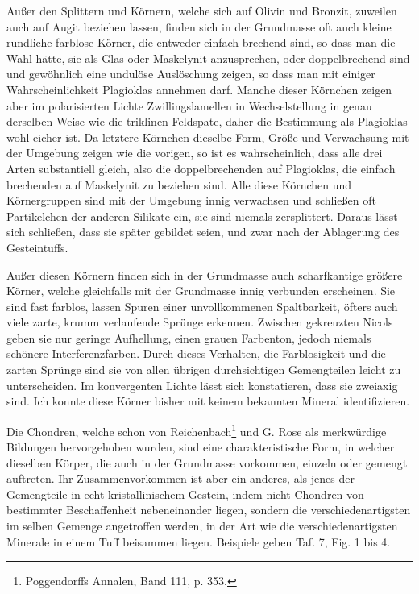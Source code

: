 \documentclass[a4paper, 12pt, oneside]{article}
\begin{document}
Außer den Splittern und Körnern, welche sich auf Olivin und Bronzit, zuweilen auch auf Augit beziehen lassen, finden sich in der Grundmasse oft auch kleine rundliche farblose Körner, die entweder einfach brechend sind, so dass man die Wahl hätte, sie als Glas oder Maskelynit anzusprechen, oder doppelbrechend sind und gewöhnlich eine undulöse Auslöschung zeigen, so dass man mit einiger Wahrscheinlichkeit Plagioklas annehmen darf. Manche dieser Körnchen zeigen aber im polarisierten Lichte Zwillingslamellen in Wechselstellung in genau derselben Weise wie die triklinen Feldspate, daher die Bestimmung als Plagioklas wohl eicher ist. Da letztere Körnchen dieselbe Form, Größe und Verwachsung mit der Umgebung zeigen wie die vorigen, so ist es wahrscheinlich, dass alle drei Arten substantiell gleich, also die doppelbrechenden auf Plagioklas, die einfach brechenden auf Maskelynit zu beziehen sind. Alle diese Körnchen und Körnergruppen sind mit der Umgebung innig verwachsen und schließen oft Partikelchen der anderen Silikate ein, sie sind niemals zersplittert. Daraus lässt sich schließen, dass sie später gebildet seien, und zwar nach der Ablagerung des Gesteintuffs.

Außer diesen Körnern finden sich in der Grundmasse auch scharfkantige größere Körner, welche gleichfalls mit der Grundmasse innig verbunden erscheinen. Sie sind fast farblos, lassen Spuren einer unvollkommenen Spaltbarkeit, öfters auch viele zarte, krumm verlaufende Sprünge erkennen. Zwischen gekreuzten Nicols geben sie nur geringe Aufhellung, einen grauen Farbenton, jedoch niemals schönere Interferenzfarben. Durch dieses Verhalten, die Farblosigkeit und die zarten Sprünge sind sie von allen übrigen durchsichtigen Gemengteilen leicht zu unterscheiden. Im konvergenten Lichte lässt sich konstatieren, dass sie zweiaxig sind. Ich konnte diese Körner bisher mit keinem bekannten Mineral identifizieren.

Die Chondren, welche schon von Reichenbach\footnote{Poggendorffs Annalen, Band 111, p. 353.} und G. Rose als merkwürdige Bildungen hervorgehoben wurden, sind eine charakteristische Form, in welcher dieselben Körper, die auch in der Grundmasse vorkommen, einzeln oder gemengt auftreten. Ihr Zusammenvorkommen ist aber ein anderes, als jenes der Gemengteile in echt kristallinischem Gestein, indem nicht Chondren von bestimmter Beschaffenheit nebeneinander liegen, sondern die verschiedenartigsten im selben Gemenge angetroffen werden, in der Art wie die verschiedenartigsten Minerale in einem Tuff beisammen liegen. Beispiele geben Taf. 7, Fig. 1 bis 4.
\end{document}
